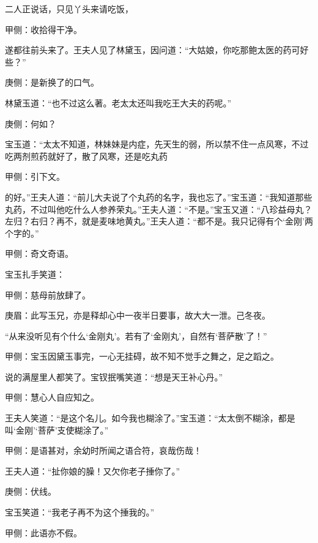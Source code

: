 \begin{parag}
    二人正说话，只见丫头来请吃饭，\begin{note}甲侧：收拾得干净。\end{note}遂都往前头来了。王夫人见了林黛玉，因问道：“大姑娘，你吃那鲍太医的药可好些？”\begin{note}庚侧：是新换了的口气。\end{note}林黛玉道：“也不过这么著。老太太还叫我吃王大夫的药呢。”\begin{note}庚侧：何如？\end{note}宝玉道：“太太不知道，林妹妹是内症，先天生的弱，所以禁不住一点风寒，不过吃两剂煎药就好了，散了风寒，还是吃丸药\begin{note}甲侧：引下文。\end{note}的好。”王夫人道：“前儿大夫说了个丸药的名字，我也忘了。”宝玉道：“我知道那些丸药，不过叫他吃什么人参养荣丸。”王夫人道：“不是。”宝玉又道：“八珍益母丸？左归？右归？再不，就是麦味地黄丸。”王夫人道：“都不是。我只记得有个‘金刚’两个字的。”\begin{note}甲侧：奇文奇语。\end{note}宝玉扎手笑道：\begin{note}甲侧：慈母前放肆了。\end{note}\begin{note}庚眉：此写玉兄，亦是释却心中一夜半日要事，故大大一泄。己冬夜。\end{note}“从来没听见有个什么‘金刚丸’。若有了‘金刚丸’，自然有‘菩萨散’了！”\begin{note}甲侧：宝玉因黛玉事完，一心无挂碍，故不知不觉手之舞之，足之蹈之。\end{note}说的满屋里人都笑了。宝钗抿嘴笑道：“想是天王补心丹。”\begin{note}甲侧：慧心人自应知之。\end{note}王夫人笑道：“是这个名儿。如今我也糊涂了。”宝玉道：“太太倒不糊涂，都是叫‘金刚’‘菩萨’支使糊涂了。”\begin{note}甲侧：是语甚对，余幼时所闻之语合符，哀哉伤哉！\end{note}王夫人道：“扯你娘的臊！又欠你老子捶你了。”\begin{note}庚侧：伏线。\end{note}宝玉笑道：“我老子再不为这个捶我的。”\begin{note}甲侧：此语亦不假。\end{note}
\end{parag}


